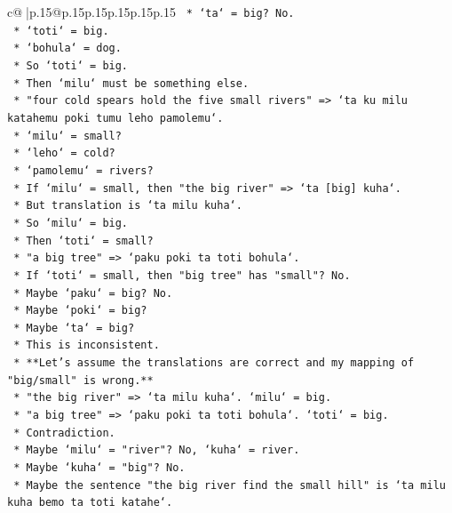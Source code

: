\documentclass{article}
\begin{document}
{\begin{supertabular}{c@{$\;$}|p{.15\linewidth}@{}p{.15\linewidth}p{.15\linewidth}p{.15\linewidth}p{.15\linewidth}p{.15\linewidth}}
{{{\texttt{            *   `ta` = big? No.} \\
\texttt{            *   `toti` = big.} \\
\texttt{            *   `bohula` = dog.} \\
\texttt{            *   So `toti` = big.} \\
\texttt{            *   Then `milu` must be something else.} \\
\texttt{            *   "four cold spears hold the five small rivers" => `ta ku milu katahemu poki tumu leho pamolemu`.} \\
\texttt{                *   `milu` = small?} \\
\texttt{                *   `leho` = cold?} \\
\texttt{                *   `pamolemu` = rivers?} \\
\texttt{            *   If `milu` = small, then "the big river" => `ta {[}big{]} kuha`.} \\
\texttt{            *   But translation is `ta milu kuha`.} \\
\texttt{            *   So `milu` = big.} \\
\texttt{            *   Then `toti` = small?} \\
\texttt{            *   "a big tree" => `paku poki ta toti bohula`.} \\
\texttt{                *   If `toti` = small, then "big tree" has "small"? No.} \\
\texttt{                *   Maybe `paku` = big? No.} \\
\texttt{                *   Maybe `poki` = big?} \\
\texttt{                *   Maybe `ta` = big?} \\
\texttt{                *   This is inconsistent.} \\
\texttt{    *   **Let's assume the translations are correct and my mapping of "big/small" is wrong.**} \\
\texttt{        *   "the big river" => `ta milu kuha`. `milu` = big.} \\
\texttt{        *   "a big tree" => `paku poki ta toti bohula`. `toti` = big.} \\
\texttt{        *   Contradiction.} \\
\texttt{        *   Maybe `milu` = "river"? No, `kuha` = river.} \\
\texttt{        *   Maybe `kuha` = "big"? No.} \\
\texttt{        *   Maybe the sentence "the big river find the small hill" is `ta milu kuha bemo ta toti katahe`.} \\
}}}
\end{supertabular}}
\end{document}

